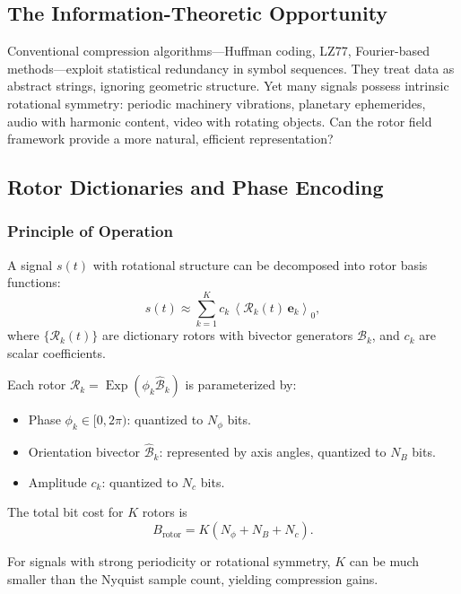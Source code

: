 \documentclass[11pt,a4paper]{article}
\newcommand{\grade}[2]{\left\langle #1 \right\rangle_{#2}}
\newcommand{\scal}[1]{\grade{#1}{0}}
\newcommand{\Exp}{\operatorname{Exp}}
\newcommand{\Rotor}{\mathcal{R}}
\newcommand{\Biv}{\mathcal{B}}
\theoremstyle{definition}
\theoremstyle{plain}
\theoremstyle{remark}
\begin{document}
\subsection{The Information-Theoretic Opportunity}

Conventional compression algorithms---Huffman coding, LZ77, Fourier-based methods---exploit statistical redundancy in symbol sequences. They treat data as abstract strings, ignoring geometric structure. Yet many signals possess intrinsic rotational symmetry: periodic machinery vibrations, planetary ephemerides, audio with harmonic content, video with rotating objects. Can the rotor field framework provide a more natural, efficient representation?

\subsection{Rotor Dictionaries and Phase Encoding}

\subsubsection{Principle of Operation}

A signal $s(t)$ with rotational structure can be decomposed into rotor basis functions:
\begin{equation}
s(t) \approx \sum_{k=1}^K c_k \,\scal{\Rotor_k(t)\, \mathbf{e}_k},
\end{equation}
where $\{\Rotor_k(t)\}$ are dictionary rotors with bivector generators $\Biv_k$, and $c_k$ are scalar coefficients.

Each rotor $\Rotor_k = \Exp(\phi_k \hat{\Biv}_k)$ is parameterized by:
\begin{itemize}
  \item Phase $\phi_k \in [0, 2\pi)$: quantized to $N_\phi$ bits.
  \item Orientation bivector $\hat{\Biv}_k$: represented by axis angles, quantized to $N_B$ bits.
  \item Amplitude $c_k$: quantized to $N_c$ bits.
\end{itemize}

The total bit cost for $K$ rotors is
\begin{equation}
B_{\text{rotor}} = K(N_\phi + N_B + N_c).
\end{equation}

For signals with strong periodicity or rotational symmetry, $K$ can be much smaller than the Nyquist sample count, yielding compression gains.
\end{document}
